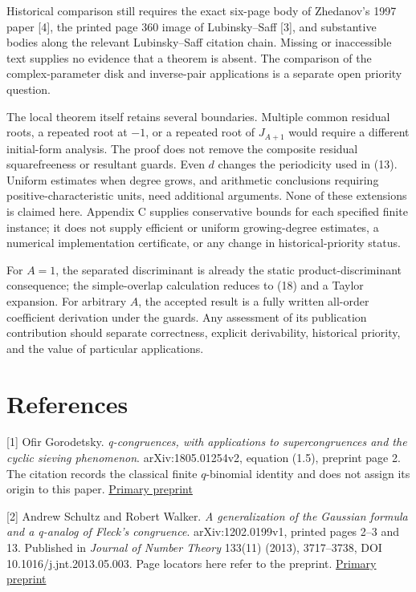 \documentclass[
  11pt,
]{article}
\begin{document}
Historical comparison still requires the exact six-page body of
Zhedanov's 1997 paper {[}4{]}, the printed page 360 image of
Lubinsky--Saff {[}3{]}, and substantive bodies along the relevant
Lubinsky--Saff citation chain. Missing or inaccessible text supplies no
evidence that a theorem is absent. The comparison of the
complex-parameter disk and inverse-pair applications is a separate open
priority question.

The local theorem itself retains several boundaries. Multiple common
residual roots, a repeated root at \(-1\), or a repeated root of
\(J_{A+1}\) would require a different initial-form analysis. The proof
does not remove the composite residual squarefreeness or resultant
guards. Even \(d\) changes the periodicity used in (13). Uniform
estimates when degree grows, and arithmetic conclusions requiring
positive-characteristic units, need additional arguments. None of these
extensions is claimed here. Appendix C supplies conservative bounds for
each specified finite instance; it does not supply efficient or uniform
growing-degree estimates, a numerical implementation certificate, or
any change in historical-priority status.

For \(A=1\), the separated discriminant is already the static
product-discriminant consequence; the simple-overlap calculation reduces
to (18) and a Taylor expansion. For arbitrary \(A\), the accepted result
is a fully written all-order coefficient derivation under the guards.
Any assessment of its publication contribution should separate
correctness, explicit derivability, historical priority, and the value
of particular applications.

\section{References}\label{references}

{[}1{]} Ofir Gorodetsky. \emph{q-congruences, with applications to
supercongruences and the cyclic sieving phenomenon}. arXiv:1805.01254v2,
equation (1.5), preprint page 2. The citation records the classical
finite \(q\)-binomial identity and does not assign its origin to this
paper. \href{https://arxiv.org/pdf/1805.01254v2}{Primary preprint}

{[}2{]} Andrew Schultz and Robert Walker. \emph{A generalization of the
Gaussian formula and a q-analog of Fleck's congruence}.
arXiv:1202.0199v1, printed pages 2--3 and 13. Published in \emph{Journal
of Number Theory} 133(11) (2013), 3717--3738, DOI
10.1016/j.jnt.2013.05.003. Page locators here refer to the preprint.
\href{https://arxiv.org/pdf/1202.0199v1}{Primary preprint}
\end{document}
